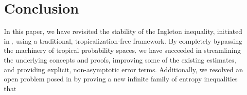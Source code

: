 \documentclass[10pt,a4paper]{amsart}
\begin{document}

\section{Conclusion}\label{sec:conc}

In this paper, we have revisited the stability of the Ingleton inequality,
initiated in \cite{rom3}, using a traditional, tropicalization-free
framework. By completely bypassing the machinery of tropical probability
spaces, we have succeeded in streamlining the underlying concepts and
proofs, improving some of the existing estimates, and providing explicit,
non-asymptotic error terms. Additionally, we resolved an open problem posed
in \cite{rom3} by proving a new infinite family of entropy inequalities that
\end{document}
